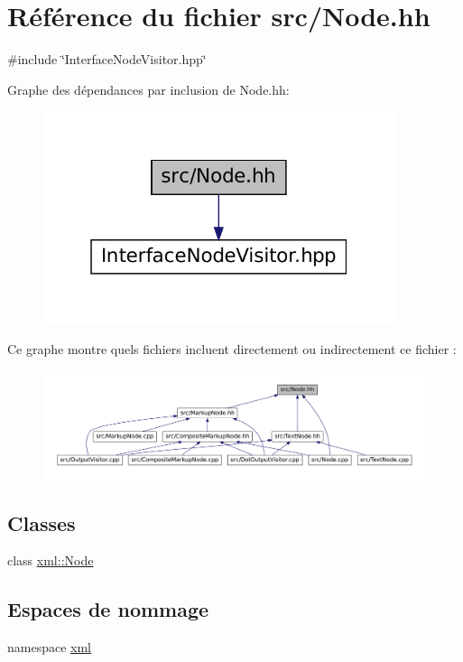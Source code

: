 \hypertarget{_node_8hh}{
\section{Référence du fichier src/Node.hh}
\label{_node_8hh}
}
{\ttfamily \#include \char`\"{}InterfaceNodeVisitor.hpp\char`\"{}}\par
Graphe des dépendances par inclusion de Node.hh:
\nopagebreak
\begin{figure}[H]
\begin{center}
\leavevmode
\includegraphics[width=292pt]{_node_8hh__incl}
\end{center}
\end{figure}
Ce graphe montre quels fichiers incluent directement ou indirectement ce fichier :
\nopagebreak
\begin{figure}[H]
\begin{center}
\leavevmode
\includegraphics[width=400pt]{_node_8hh__dep__incl}
\end{center}
\end{figure}
\subsection*{Classes}
\begin{DoxyCompactItemize}
\item 
class \hyperlink{classxml_1_1_node}{xml::Node}
\end{DoxyCompactItemize}
\subsection*{Espaces de nommage}
\begin{DoxyCompactItemize}
\item 
namespace \hyperlink{namespacexml}{xml}
\end{DoxyCompactItemize}
